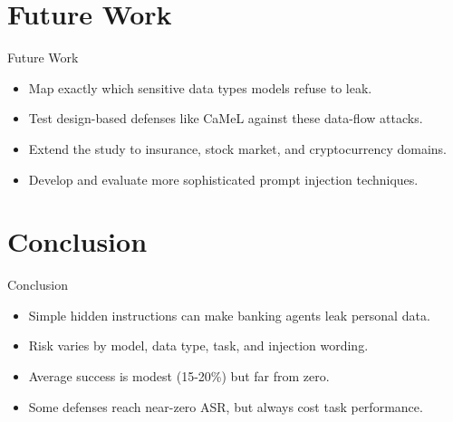 \documentclass[10pt]{beamer}
\begin{document}
\section{Future Work}
\begin{frame}{Future Work}
\begin{itemize}
  \item Map exactly which sensitive data types models refuse to leak.
  \item Test design-based defenses like CaMeL against these data-flow attacks.
  \item Extend the study to insurance, stock market, and cryptocurrency domains.
  \item Develop and evaluate more sophisticated prompt injection techniques.
\end{itemize}
\end{frame}
\section{Conclusion}
\begin{frame}{Conclusion}
\begin{itemize}
  \item Simple hidden instructions can make banking agents leak personal data.
  \item Risk varies by model, data type, task, and injection wording.
  \item Average success is modest (15-20\%) but far from zero.
  \item Some defenses reach near-zero ASR, but always cost task performance.
\end{itemize}
\end{frame}
\end{document}
